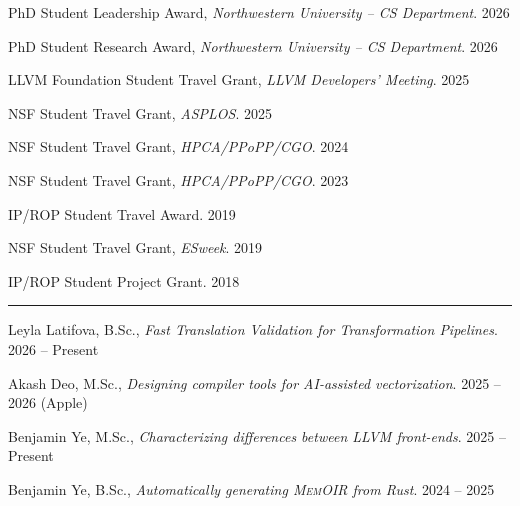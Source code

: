 \documentclass{article}
\begin{document}
PhD Student Leadership Award, {\em Northwestern University -- CS Department}. \hfill 2026

PhD Student Research Award, {\em Northwestern University -- CS Department}. \hfill 2026

LLVM Foundation Student Travel Grant, {\em LLVM Developers' Meeting}. \hfill 2025

NSF Student Travel Grant, {\em ASPLOS}. \hfill 2025

NSF Student Travel Grant, {\em HPCA/PPoPP/CGO}. \hfill 2024

NSF Student Travel Grant, {\em HPCA/PPoPP/CGO}. \hfill 2023

IP/ROP Student Travel Award. \hfill 2019

NSF Student Travel Grant, {\em ESweek}. \hfill 2019

IP/ROP Student Project Grant. \hfill 2018


    
\vspace{1em}
\hrule
\vspace{0.5em}


\vspace{0.5em}


  Leyla Latifova, B.Sc., {\em Fast Translation Validation for Transformation Pipelines}. \hfill 2026 -- Present

  Akash Deo, M.Sc., {\em Designing compiler tools for AI-assisted vectorization}. \hfill 2025 -- 2026 (Apple)

  Benjamin Ye, M.Sc., {\em Characterizing differences between LLVM front-ends}. \hfill 2025 -- Present

  Benjamin Ye, B.Sc., {\em Automatically generating \textsc{MemOIR} from Rust}. \hfill 2024 -- 2025
\end{document}
